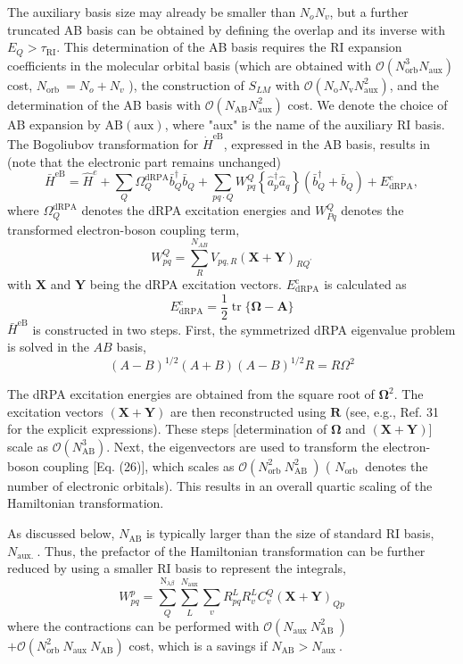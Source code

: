 The auxiliary basis size may already be smaller than $N_o N_v$, but a further truncated AB basis can be obtained by defining the overlap and its inverse with $E_Q>\tau_{\mathrm{RI}}$. This determination of the AB basis requires the RI expansion coefficients in the molecular orbital basis (which are obtained with $\mathcal{O}\left(N_{\mathrm{orb}}^3 N_{\mathrm{aux}}\right)$ cost, $N_{\text {orb }}=N_o+N_v$ ), the construction of $S_{L M}$ with $\mathcal{O}\left(N_{\mathrm{o}} N_{\mathrm{v}} N_{\mathrm{aux}}^2\right)$, and the determination of the AB basis with $\mathcal{O}\left(N_{\mathrm{AB}} N_{\mathrm{aux}}^2\right)$ cost. We denote the choice of AB expansion by $\mathrm{AB}(\mathrm{aux})$, where "aux" is the name of the auxiliary RI basis.
The Bogoliubov transformation for $\dot{H}^{\mathrm{eB}}$, expressed in the AB basis, results in (note that the electronic part remains unchanged)
$$
\bar{H}^{\mathrm{eB}}=\hat{H}^e+\sum_Q \Omega_Q^{\mathrm{dRPA}} \bar{b}_Q^{\dagger} \bar{b}_Q+\sum_{p q \cdot Q} W_{p q}^Q\left\{\hat{a}_p^{\dagger} \hat{a}_q\right\}\left(\bar{b}_Q^{\dagger}+\bar{b}_Q\right)+E_{\mathrm{dRPA}}^c,
$$
where $\Omega_Q^{\mathrm{dRPA}}$ denotes the dRPA excitation energies and $W_{P q}^Q$ denotes the transformed electron-boson coupling term,
$$
W_{p q}^Q=\sum_R^{N_{A B}} V_{p q, R}(\mathbf{X}+\mathbf{Y})_{R Q^{\prime}}
$$
with $\mathbf{X}$ and $\mathbf{Y}$ being the dRPA excitation vectors. $E_{\mathrm{dRPA}}^{\mathrm{c}}$ is calculated as
$$
E_{\mathrm{dRPA}}^c=\frac{1}{2} \operatorname{tr}\{\boldsymbol{\Omega}-\mathbf{A}\}
$$
$\bar{H}^{\mathrm{eB}}$ is constructed in two steps. First, the symmetrized dRPA eigenvalue problem is solved in the $A B$ basis,
$$
(A-B)^{1 / 2}(A+B)(A-B)^{1 / 2} R=R \Omega^2
$$

The dRPA excitation energies are obtained from the square root of $\mathbf{\Omega}^2$. The excitation vectors $(\mathbf{X}+\mathbf{Y})$ are then reconstructed using $\mathbf{R}$ (see, e.g., Ref. 31 for the explicit expressions). These steps [determination of $\boldsymbol{\Omega}$ and $(\mathbf{X}+\mathbf{Y})]$ scale as $\mathcal{O}\left(N_{\mathrm{AB}}^3\right)$. Next, the eigenvectors are used to transform the electron-boson coupling [Eq. (26)], which scales as $\mathcal{O}\left(N_{\text {orb }}^2 N_{\text {AB }}^2\right)$ ( $N_{\text {orb }}$ denotes the number of electronic orbitals). This results in an overall quartic scaling of the Hamiltonian transformation.

As discussed below, $N_{\mathrm{AB}}$ is typically larger than the size of standard RI basis, $N_{\text {aux. }}$. Thus, the prefactor of the Hamiltonian transformation can be further reduced by using a smaller RI basis to represent the integrals,
$$
W_{p q}^p=\sum_Q^{\mathrm{N}_{\lambda \beta}} \sum_L^{N_{\mathrm{aux}}} \sum_v R_{p q}^L R_v^L C_v^Q(\mathbf{X}+\mathbf{Y})_{Q p}
$$
where the contractions can be performed with $\mathcal{O}\left(N_{\text {aux }} N_{\text {AB }}^2\right)$ $+\mathcal{O}\left(N_{\text {orb }}^2 N_{\text {aux }} N_{\mathrm{AB}}\right)$ cost, which is a savings if $N_{\mathrm{AB}}>N_{\text {aux }}$.

